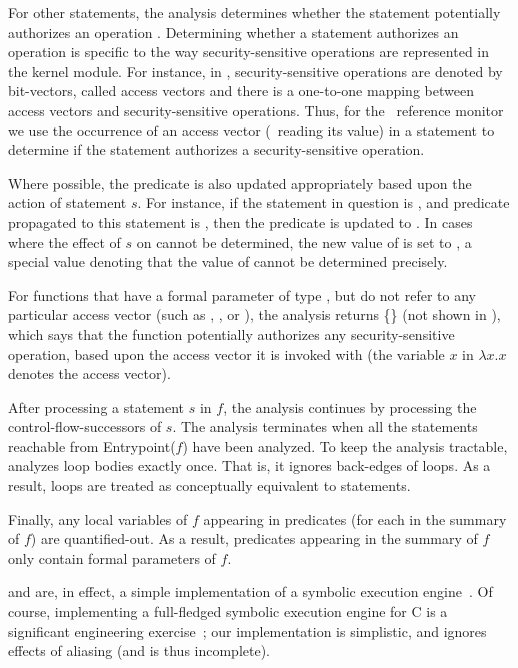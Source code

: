 For other statements, the analysis determines whether the statement potentially
authorizes an operation . Determining whether a statement authorizes an
operation  is specific to the way security-sensitive operations are
represented in the kernel module. For instance, in \selinux, security-sensitive
operations are denoted by bit-vectors, called access vectors and there is a
one-to-one mapping between access vectors and security-sensitive operations.
Thus, for the \selinux\ reference monitor we use the occurrence of an access
vector (\eg~reading its value) in a statement to determine if the statement
authorizes a security-sensitive operation.

Where possible, the predicate  is also updated appropriately based upon
the action of statement $s$. For instance, if the statement in question is
, and predicate  propagated to this statement is
, then the predicate  is updated to . In cases where the effect of $s$ on  cannot be
determined, the new value of  is set to , a special value
denoting that the value of  cannot be determined precisely.

For functions that have a formal parameter of type , but do
not refer to any particular access vector (such as ,
, or ), the analysis returns
\{\} (not shown in
), which says that the function potentially
authorizes any security-sensitive operation, based upon the access vector it is
invoked with (the variable $x$ in $\lambda$$x.x$ denotes the access vector).

After processing a statement $s$ in $f$, the analysis continues by processing
the control-flow-successors of $s$. The analysis terminates when all the
statements reachable from \textsf{Entrypoint}{($f$)} have been analyzed.  To keep
the analysis tractable,  analyzes loop bodies
exactly once.  That is, it ignores back-edges of loops. As a result, loops are
treated as conceptually equivalent to  statements.

Finally, any local variables of $f$ appearing in predicates  (for
each  in the summary of $f$) are quantified-out. As a result,
predicates appearing in the summary of $f$ only contain formal parameters of
$f$. 

 and  are, in
effect, a simple implementation of a symbolic execution engine~\cite{k76}. Of
course, implementing a full-fledged symbolic execution engine for C is a
significant engineering exercise~\cite{gks05,sma05}; our implementation is
simplistic, and ignores effects of aliasing (and is thus incomplete).

